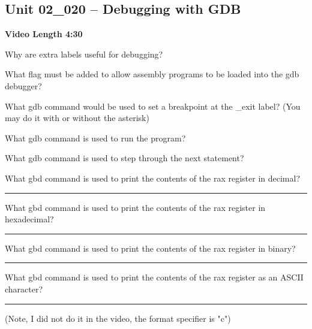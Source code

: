 \documentclass[letterpaper,12pt]{exam}
\newcommand{\unit}{Unit 02}
\begin{document}
\begin{questions}
 \section*{\unit\_020 -- Debugging with GDB }
 \par{\selectfont\textbf{Video Length 4:30}}
 \begin{samepage}
     \question Why are extra labels useful for debugging?
     \vspace{5mm}
 \end{samepage}
 \begin{samepage}
     \question What flag must be added to allow assembly programs to be loaded into the gdb debugger?
     \vspace{5mm}
 \end{samepage}
 \par
  \begin{samepage}
      \question What gdb command would be used to set a breakpoint at the \_exit label?  (You may do it with or without the asterisk)
      \vspace{5mm}
  \end{samepage}
  \par
   \begin{samepage}
       \question What gdb command is used to run the program?
       \vspace{5mm}
   \end{samepage}
   \par
    \begin{samepage}
        \question What gdb command is used to step through the next statement?
        \vspace{5mm}
    \end{samepage}
    \par
     \begin{samepage}
         \question What gbd command is used to print the contents of the rax register in decimal? \rule{5cm}{0.15mm}
         \vspace{5mm}
         \question What gbd command is used to print the contents of the rax register in hexadecimal? \rule{5cm}{0.15mm}
         \vspace{5mm}
         \question What gbd command is used to print the contents of the rax register in binary? \rule{5cm}{0.15mm}
         \vspace{5mm}
         \question What gbd command is used to print the contents of the rax register as an ASCII character? \rule{5cm}{0.15mm} (Note, I did not do it in the video, the format specifier is "c")
         \vspace{5mm}


\end{samepage}
\end{questions}
\end{document}
